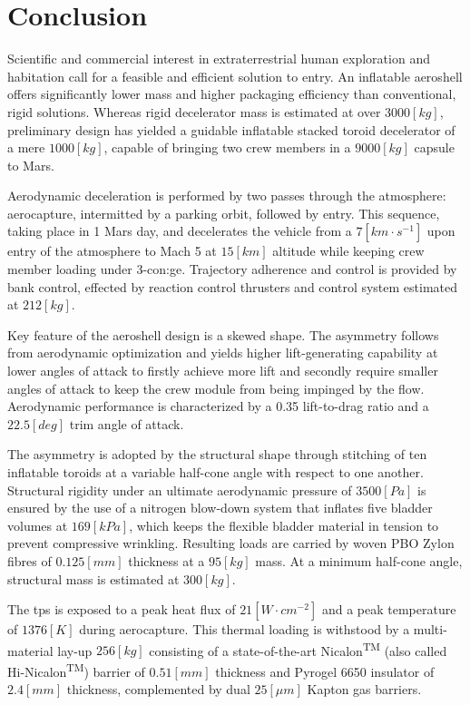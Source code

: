 \section{Conclusion}

Scientific and commercial interest in extraterrestrial human exploration and habitation call for a feasible and efficient solution to entry. An inflatable aeroshell offers significantly lower mass and higher packaging efficiency than conventional, rigid solutions. Whereas rigid decelerator mass is estimated at over $3000 \left[kg\right] $, preliminary design has yielded a guidable inflatable stacked toroid decelerator of a mere $1000 \left[kg\right]$, capable of bringing two crew members in a $9000 \left[kg\right]$ capsule to Mars.

Aerodynamic deceleration is performed by two passes through the atmosphere: aerocapture, intermitted by a parking orbit, followed by entry. This sequence, taking place in 1 Mars day, and decelerates the vehicle from a $7 \left[km\cdot s^{-1}\right]$ upon entry of the atmosphere to Mach 5 at $15 \left[km\right]$ altitude while keeping crew member loading under 3-\gls{con:ge}. Trajectory adherence and control is provided by bank control, effected by reaction control thrusters and control system estimated at $212 \left[kg\right]$.

Key feature of the aeroshell design is a skewed shape. The asymmetry follows from aerodynamic optimization and yields higher lift-generating capability at lower angles of attack to firstly achieve more lift and secondly require smaller angles of attack to keep the crew module from being impinged by the flow. Aerodynamic performance is characterized by a 0.35 lift-to-drag ratio and a $22.5 \left[deg\right]$ trim angle of attack.

The asymmetry is adopted by the structural shape through stitching of ten inflatable toroids at a variable half-cone angle with respect to one another. Structural rigidity under an ultimate aerodynamic pressure of $3500 \left[Pa\right]$ is ensured by the use of a nitrogen blow-down system that inflates five bladder volumes at $169 \left[kPa\right]$, which keeps the flexible bladder material in tension to prevent compressive wrinkling. Resulting loads are carried by woven PBO Zylon\textsuperscript{\textregistered} fibres of $0.125 \left[mm\right]$ thickness at a $95 \left[kg\right]$ mass. At a minimum half-cone angle, structural mass is estimated at $300 \left[kg\right]$. 

The \acrlong{tps} is exposed to a peak heat flux of $21 \left[W\cdot cm^{-2}\right]$ and a peak temperature of $1376 \left[ K \right] $ during aerocapture. This thermal loading is withstood by a multi-material lay-up $256 \left[ kg \right] $ consisting of a state-of-the-art Nicalon\textsuperscript{TM} (also called Hi-Nicalon\textsuperscript{TM}) barrier of $0.51 \left[ mm \right] $  thickness and Pyrogel\textsuperscript{\textregistered} 6650 insulator of $2.4 \left[ mm \right] $  thickness, complemented by dual $25 \left[ \mu m \right] $  Kapton gas barriers. 

